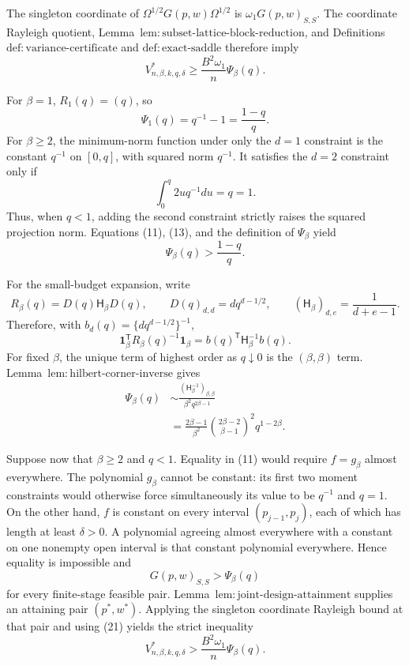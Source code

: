 The singleton coordinate of \(\Omega^{1/2}G(p,w)\Omega^{1/2}\) is \(\omega_1G(p,w)_{S,S}\).  The coordinate Rayleigh quotient, Lemma~\(\mathrm{lem{:}subset\text{-}lattice\text{-}block\text{-}reduction}\), and Definitions~\(\mathrm{def{:}variance\text{-}certificate}\) and \(\mathrm{def{:}exact\text{-}saddle}\) therefore imply
\[
V^*_{n,\beta,k,q,\delta}
\ge\frac{B^2\omega_1}{n}\Psi_\beta(q).
\tag{15}
\]

For \(\beta=1\), \(R_1(q)=(q)\), so
\[
\Psi_1(q)=q^{-1}-1=\frac{1-q}{q}.
\tag{16}
\]
For \(\beta\ge2\), the minimum-norm function under only the \(d=1\) constraint is the constant \(q^{-1}\) on \([0,q]\), with squared norm \(q^{-1}\).  It satisfies the \(d=2\) constraint only if
\[
\int_0^q2u q^{-1}du=q=1.
\]
Thus, when \(q<1\), adding the second constraint strictly raises the squared projection norm.  Equations (11), (13), and the definition of \(\Psi_\beta\) yield
\[
\Psi_\beta(q)>\frac{1-q}{q}.
\tag{17}
\]

For the small-budget expansion, write
\[
R_\beta(q)=D(q)\mathsf H_\beta D(q),
\qquad
D(q)_{d,d}=d q^{d-1/2},
\qquad
(\mathsf H_\beta)_{d,e}=\frac1{d+e-1}.
\tag{18}
\]
Therefore, with \(b_d(q)=\{d q^{d-1/2}\}^{-1}\),
\[
\mathbf1_\beta^{\mathsf T}R_\beta(q)^{-1}\mathbf1_\beta
=b(q)^{\mathsf T}\mathsf H_\beta^{-1}b(q).
\tag{19}
\]
For fixed \(\beta\), the unique term of highest order as \(q\downarrow0\) is the \((\beta,\beta)\) term.  Lemma~\(\mathrm{lem{:}hilbert\text{-}corner\text{-}inverse}\) gives
\[
\begin{aligned}
\Psi_\beta(q)
&\sim\frac{(\mathsf H_\beta^{-1})_{\beta,\beta}}
{\beta^2q^{2\beta-1}}\\
&=\frac{2\beta-1}{\beta^2}
\binom{2\beta-2}{\beta-1}^{\!2}q^{1-2\beta}.
\end{aligned}
\tag{20}
\]

Suppose now that \(\beta\ge2\) and \(q<1\).  Equality in (11) would require \(f=g_\beta\) almost everywhere.  The polynomial \(g_\beta\) cannot be constant: its first two moment constraints would otherwise force simultaneously its value to be \(q^{-1}\) and \(q=1\).  On the other hand, \(f\) is constant on every interval \((p_{j-1},p_j)\), each of which has length at least \(\delta>0\).  A polynomial agreeing almost everywhere with a constant on one nonempty open interval is that constant polynomial everywhere.  Hence equality is impossible and
\[
G(p,w)_{S,S}>\Psi_\beta(q)
\tag{21}
\]
for every finite-stage feasible pair.  Lemma~\(\mathrm{lem{:}joint\text{-}design\text{-}attainment}\) supplies an attaining pair \((p^*,w^*)\).  Applying the singleton coordinate Rayleigh bound at that pair and using (21) yields the strict inequality
\[
V^*_{n,\beta,k,q,\delta}
>\frac{B^2\omega_1}{n}\Psi_\beta(q).
\tag{22}
\]

